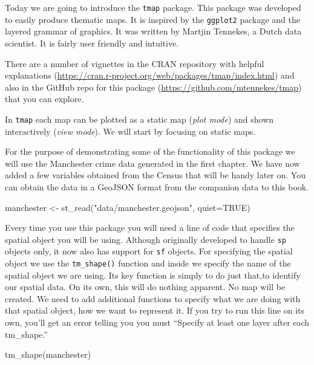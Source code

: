 \documentclass[
]{book}
\makeatletter
\newenvironment{Shaded}{\begin{snugshade}}{\end{snugshade}}
\newcommand{\AttributeTok}[1]{\textcolor[rgb]{0.61,0.61,0.61}{#1}}
\newcommand{\ConstantTok}[1]{\textcolor[rgb]{0,0,0}{#1}}
\newcommand{\FunctionTok}[1]{\textcolor[rgb]{0,0,0}{#1}}
\newcommand{\NormalTok}[1]{#1}
\newcommand{\OtherTok}[1]{\textcolor[rgb]{0.37,0.37,0.37}{#1}}
\newcommand{\StringTok}[1]{\textcolor[rgb]{0.5,0.5,0.5}{#1}}
\newenvironment{kframe}{%
\medskip{}
\setlength{\fboxsep}{.8em}
 \def\at@end@of@kframe{}%
 \ifinner\ifhmode%
  \def\at@end@of@kframe{\end{minipage}}%
  \begin{minipage}{\columnwidth}%
 \fi\fi%
 \def\FrameCommand##1{\hskip\@totalleftmargin \hskip-\fboxsep
 \colorbox{shadecolor}{##1}\hskip-\fboxsep
     \hskip-\linewidth \hskip-\@totalleftmargin \hskip\columnwidth}%
 \MakeFramed {\advance\hsize-\width
   \@totalleftmargin\z@ \linewidth\hsize
   \@setminipage}}%
 {\par\unskip\endMakeFramed%
 \at@end@of@kframe}
\renewenvironment{Shaded}{\begin{kframe}}{\end{kframe}}
\makeatother
\begin{document}
Today we are going to introduce the \texttt{tmap} package. This package was developed to easily produce thematic maps. It is inspired by the \texttt{ggplot2} package and the layered grammar of graphics. It was written by Martjin Tennekes, a Dutch data scientist. It is fairly user friendly and intuitive.

There are a number of vignettes in the CRAN repository with helpful explanations (\url{https://cran.r-project.org/web/packages/tmap/index.html}) and also in the GitHub repo for this package (\url{https://github.com/mtennekes/tmap}) that you can explore.

In \texttt{tmap} each map can be plotted as a static map (\emph{plot mode}) and shown interactively (\emph{view mode}). We will start by focusing on static maps.

For the purpose of demonstrating some of the functionality of this package we will use the Manchester crime data generated in the first chapter. We have now added a few variables obtained from the Census that will be handy later on. You can obtain the data in a GeoJSON format from the companion data to this book.

\begin{Shaded}
\begin{Highlighting}[]
\NormalTok{manchester }\OtherTok{\textless{}{-}} \FunctionTok{st\_read}\NormalTok{(}\StringTok{"data/manchester.geojson"}\NormalTok{, }\AttributeTok{quiet=}\ConstantTok{TRUE}\NormalTok{)}
\end{Highlighting}
\end{Shaded}

Every time you use this package you will need a line of code that specifies the spatial object you will be using. Although originally developed to handle \texttt{sp} objects only, it now also has support for \texttt{sf} objects. For specifying the spatial object we use the \texttt{tm\_shape()} function and inside we specify the name of the spatial object we are using. Its key function is simply to do just that,to identify our spatial data. On its own, this will do nothing apparent. No map will be created. We need to add additional functions to specify what we are doing with that spatial object, how we want to represent it. If you try to run this line on its own, you'll get an error telling you you must ``Specify at least one layer after each tm\_shape.''

\begin{Shaded}
\begin{Highlighting}[]
\FunctionTok{tm\_shape}\NormalTok{(manchester)}
\end{Highlighting}
\end{Shaded}
\end{document}
